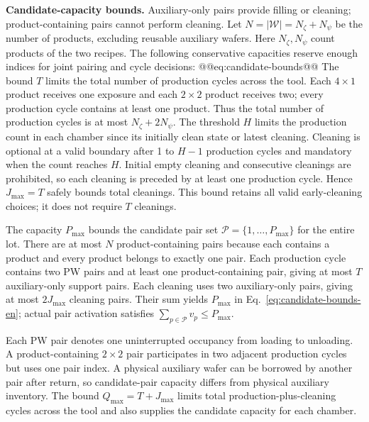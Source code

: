 \noindent\textbf{Candidate-capacity bounds.}
Auxiliary-only pairs provide filling or cleaning; product-containing pairs cannot perform cleaning. Let $N=|\mathcal W|=N_{\zeta}+N_{\psi}$ be the number of products, excluding reusable auxiliary wafers. Here $N_{\zeta},N_{\psi}$ count products of the two recipes. The following conservative capacities reserve enough indices for joint pairing and cycle decisions:
@@eq:candidate-bounds@@
The bound $T$ limits the total number of production cycles across the tool. Each $4\times1$ product receives one exposure and each $2\times2$ product receives two; every production cycle contains at least one product. Thus the total number of production cycles is at most $N_{\zeta}+2N_{\psi}$. The threshold $H$ limits the production count in each chamber since its initially clean state or latest cleaning. Cleaning is optional at a valid boundary after 1 to $H-1$ production cycles and mandatory when the count reaches $H$. Initial empty cleaning and consecutive cleanings are prohibited, so each cleaning is preceded by at least one production cycle. Hence $J_{\max}=T$ safely bounds total cleanings. This bound retains all valid early-cleaning choices; it does not require $T$ cleanings.

The capacity $P_{\max}$ bounds the candidate pair set $\mathcal P=\{1,\ldots,P_{\max}\}$ for the entire lot. There are at most $N$ product-containing pairs because each contains a product and every product belongs to exactly one pair. Each production cycle contains two PW pairs and at least one product-containing pair, giving at most $T$ auxiliary-only support pairs. Each cleaning uses two auxiliary-only pairs, giving at most $2J_{\max}$ cleaning pairs. Their sum yields $P_{\max}$ in Eq.~\eqref{eq:candidate-bounds-en}; actual pair activation satisfies $\sum_{p\in\mathcal P}v_p\le P_{\max}$.

Each PW pair denotes one uninterrupted occupancy from loading to unloading. A product-containing $2\times2$ pair participates in two adjacent production cycles but uses one pair index. A physical auxiliary wafer can be borrowed by another pair after return, so candidate-pair capacity differs from physical auxiliary inventory. The bound $Q_{\max}=T+J_{\max}$ limits total production-plus-cleaning cycles across the tool and also supplies the candidate capacity for each chamber.

